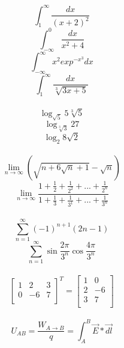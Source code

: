 \documentclass[a4paper]{article}
\begin{document}
$$
\int_{1}^{\infty} \frac{dx}{(x+2)^2} $$
$$
\int_{- \infty}^{0} \frac{dx}{x^{2}+4} $$
$$
\int_{- \infty}^{\infty} x^{2}exp^{-x^{3}}dx $$
$$
\int_{1}^{\infty} \frac{dx}{\sqrt[3]{3x+5}} $$\\

$$
\log_{\sqrt{5}}5\sqrt[3]{5} $$
$$
\log_{\sqrt[3]{3}}27 $$
$$
\log_{2}8\sqrt{2} $$\\

$$
\lim_{n \rightarrow \infty}(\sqrt{n+6\sqrt{n}+1}-\sqrt{n}) $$
$$
\lim_{n \to \infty} \frac{1 + \frac{1}{2} + \frac{1}{2^2} + ... + \frac{1}{2^n}}{1 + \frac{1}{3} + \frac{1}{3^1} + ... + \frac{1}{3^n}} $$\\

$$
\sum_{n=1}^{\infty}(-1)^{n+1}(2n-1) $$
$$
\sum_{n=1}^{\infty} \sin \frac{2\pi}{3^n} \cos \frac{4\pi}{3^n} $$\\

$$
\left[ \begin{array}{ccc}
1 & 2 & 3 \\
0 & -6 & 7 \\
\end{array} \right]^{T} 
=
\left[ \begin{array}{cc}
1 & 0\\
2 & -6\\
3 & 7\\
\end{array} \right]
$$\\


$$
U_{AB}=\frac{W_{A \to B}}{q}=\int_{A}^{B}\vec{E}*\vec{dl} $$\\
\end{document}
